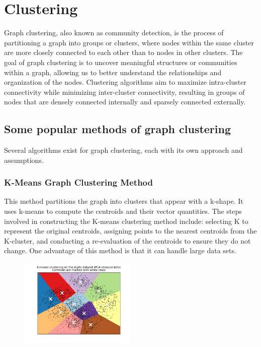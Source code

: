 \documentclass[12pt, a4paper]{article}
\begin{document}
    \section{Clustering}
    \begin{flushleft}
        Graph clustering, also known as community detection, is the process of partitioning a graph into groups or clusters, where nodes within the same cluster are more closely connected to each other than to nodes in other clusters. The goal of graph clustering is to uncover meaningful structures or communities within a graph, allowing us to better understand the relationships and organization of the nodes. Clustering algorithms aim to maximize intra-cluster connectivity while minimizing inter-cluster connectivity, resulting in groups of nodes that are densely connected internally and sparsely connected externally.
        
        
        \subsection{Some popular methods of graph clustering}
        Several algorithms exist for graph clustering, each with its own approach and assumptions.
        \subsubsection{K-Means Graph Clustering Method}
        \begin{flushleft}
            This method partitions the graph into clusters that appear with a k-shape. It uses k-means to compute the centroids and their vector quantities. The steps involved in constructing the K-means clustering method include: selecting K to represent the original centroids, assigning points to the nearest centroids from the K-cluster, and conducting a re-evaluation of the centroids to ensure they do not change. One advantage of this method is that it can handle large data sets.

            \begin{figure}[h]
            \centering
            \includegraphics[width=0.5\textwidth]{k-means_based.png}
            \end{figure}
        \end{flushleft}


\end{flushleft}
\end{document}
